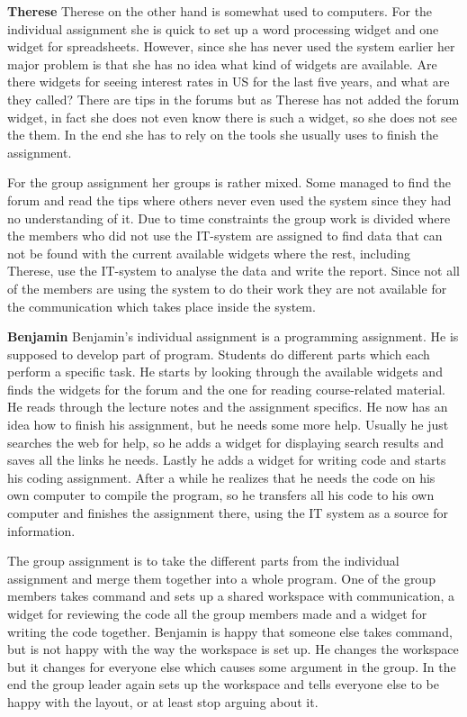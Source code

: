 \textbf {Therese} Therese on the other hand is somewhat used to computers. For the individual assignment she is quick to set up a word processing widget and one widget for spreadsheets. However, since she has never used the system earlier her major problem is that she has no idea what kind of widgets are available. Are there widgets for seeing interest rates in US for the last five years, and what are they called? There are tips in the forums but as Therese has not added the forum widget, in fact she does not even know there is such a widget, so she does not see the them. In the end she has to rely on the tools she usually uses to finish the assignment.

For the group assignment her groups is rather mixed. Some managed to find the forum and read the tips where others never even used the system since they had no understanding of it. Due to time constraints the group work is divided where the members who did not use the IT-system are assigned to find data that can not be found with the current available widgets where the rest, including Therese, use the IT-system to analyse the data and write the report. Since not all of the members are using the system to do their work they are not available for the communication which takes place inside the system.

\textbf {Benjamin} Benjamin's individual assignment is a programming assignment. He is supposed to develop part of program. Students do different parts which each perform a specific task. He starts by looking through the available widgets and finds the widgets for the forum and the one for reading course-related material. He reads through the lecture notes and the assignment specifics. He now has an idea how to finish his assignment, but he needs some more help. Usually he just searches the web for help, so he adds a widget for displaying search results and saves all the links he needs. Lastly he adds a widget for writing code and starts his coding assignment. After a while he realizes that he needs the code on his own computer to compile the program, so he transfers all his code to his own computer and finishes the assignment there, using the IT system as a source for information.

The group assignment is to take the different parts from the individual assignment and merge them together into a whole program. One of the group members takes command and sets up a shared workspace with communication, a widget for reviewing the code all the group members made and a widget for writing the code together. Benjamin is happy that someone else takes command, but is not happy with the way the workspace is set up. He changes the workspace but it changes for everyone else which causes some argument in the group. In the end the group leader again sets up the workspace and tells everyone else to be happy with the layout, or at least stop arguing about it.

